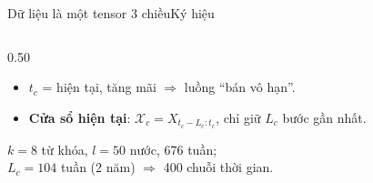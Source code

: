 \begin{frame}{Dữ liệu là một tensor 3 chiều}{Ký hiệu}
\begin{columns}[c,onlytextwidth]
\begin{column}{0.50\textwidth}
\begin{itemize}
      \textbf{tensor bậc 3}: keyword $\times$ location $\times$ time.
    \item $t_c$ = hiện tại, tăng mãi $\Rightarrow$ luồng ``bán vô hạn''.
    \item \textbf{Cửa sổ hiện tại}: $\mathcal X_c=X_{t_c-L_c:t_c}$, chỉ giữ $L_c$ bước gần nhất.
  \end{itemize}
  \vspace{1mm}
  \begin{intuition}[Ví dụ Device]
    \small $k=8$ từ khóa, $l=50$ nước, 676 tuần;\\
    $L_c=104$ tuần (2 năm) $\Rightarrow$ 400 chuỗi thời gian.
  \end{intuition}
\end{column}
\end{columns}
\vfill
{}
\end{frame}

